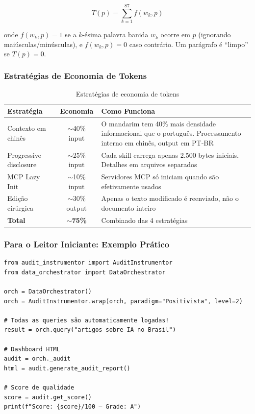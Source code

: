 \documentclass[12pt,a4paper]{article}
\begin{document}
\begin{equation}
  T(p) = \sum_{k=1}^{87} f(w_k, p)
\end{equation}

onde $f(w_k, p) = 1$ se a $k$-ésima palavra banida $w_k$ ocorre em $p$ (ignorando maiúsculas/minúsculas), e $f(w_k, p) = 0$ caso contrário. Um parágrafo é ``limpo'' se $T(p) = 0$.

\subsubsection{Estratégias de Economia de Tokens}

\begin{table}[H]
  \centering
  \caption{Estratégias de economia de tokens}
  \begin{tabular}{l c p{6cm}}
    \toprule
    \textbf{Estratégia} & \textbf{Economia} & \textbf{Como Funciona} \\
    \midrule
    Contexto em chinês    & $\sim$40\% input  & O mandarim tem 40\% mais densidade informacional que o português. Processamento interno em chinês, output em PT-BR \\
    Progressive disclosure & $\sim$25\% input  & Cada skill carrega apenas 2.500 bytes iniciais. Detalhes em arquivos separados \\
    MCP Lazy Init          & $\sim$10\% input  & Servidores MCP só iniciam quando são efetivamente usados \\
    Edição cirúrgica       & $\sim$30\% output & Apenas o texto modificado é reenviado, não o documento inteiro \\
    \textbf{Total}         & \textbf{$\sim$75\%} & Combinado das 4 estratégias \\
    \bottomrule
  \end{tabular}
\end{table}

\subsubsection{Para o Leitor Iniciante: Exemplo Prático}

\begin{verbatim}
from audit_instrumentor import AuditInstrumentor
from data_orchestrator import DataOrchestrator

orch = DataOrchestrator()
orch = AuditInstrumentor.wrap(orch, paradigm="Positivista", level=2)

# Todas as queries são automaticamente logadas!
result = orch.query("artigos sobre IA no Brasil")

# Dashboard HTML
audit = orch._audit
html = audit.generate_audit_report()

# Score de qualidade
score = audit.get_score()
print(f"Score: {score}/100 — Grade: A")
\end{verbatim}
\end{document}
